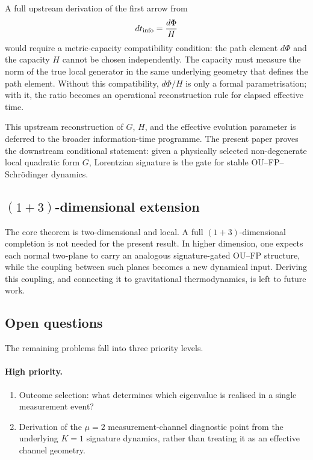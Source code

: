 \documentclass[11pt,a4paper]{article}
\theoremstyle{definition}
\begin{document}
A full upstream derivation of the first arrow from
\[
dt_{\rm info}=\frac{d\Phi}{H}
\]
would require a metric-capacity compatibility condition: the path element
$d\Phi$ and the capacity $H$ cannot be chosen independently. The capacity
must measure the norm of the true local generator in the same underlying
geometry that defines the path element. Without this compatibility,
$d\Phi/H$ is only a formal parametrisation; with it, the ratio becomes an
operational reconstruction rule for elapsed effective time.

This upstream reconstruction of $G$, $H$, and the effective evolution
parameter is deferred to the broader information-time programme. The
present paper proves the downstream conditional statement: given a
physically selected non-degenerate local quadratic form $G$, Lorentzian
signature is the gate for stable OU--FP--Schr\"odinger dynamics.

\subsection{$(1{+}3)$-dimensional extension}

The core theorem is two-dimensional and local. A full $(1+3)$-dimensional
completion is not needed for the present result. In higher dimension, one expects
each normal two-plane to carry an analogous signature-gated OU--FP structure,
while the coupling between such planes becomes a new dynamical input. Deriving
this coupling, and connecting it to gravitational thermodynamics, is left to
future work.

\subsection{Open questions}\label{sec:open}

The remaining problems fall into three priority levels.

\paragraph{High priority.}
\begin{enumerate}
\item Outcome selection: what determines which eigenvalue is realised in
a single measurement event?
\item Derivation of the $\mu=2$ measurement-channel diagnostic point from the
underlying $K{=}1$ signature dynamics, rather than treating it as an
effective channel geometry.
\end{enumerate}
\end{document}
